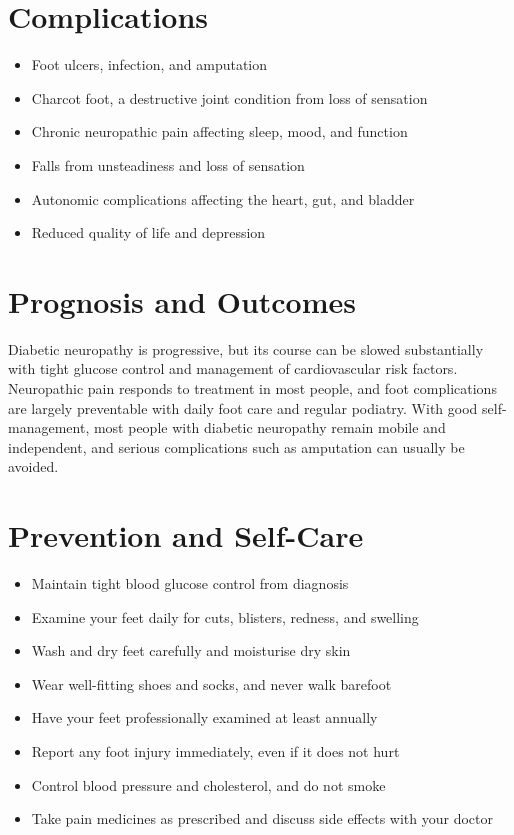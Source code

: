 \section*{Complications}
\begin{itemize}
    \item Foot ulcers, infection, and amputation
    \item Charcot foot, a destructive joint condition from loss of sensation
    \item Chronic neuropathic pain affecting sleep, mood, and function
    \item Falls from unsteadiness and loss of sensation
    \item Autonomic complications affecting the heart, gut, and bladder
    \item Reduced quality of life and depression
\end{itemize}

\section*{Prognosis and Outcomes}
Diabetic neuropathy is progressive, but its course can be slowed substantially with tight glucose control and management of cardiovascular risk factors. Neuropathic pain responds to treatment in most people, and foot complications are largely preventable with daily foot care and regular podiatry. With good self-management, most people with diabetic neuropathy remain mobile and independent, and serious complications such as amputation can usually be avoided.

\section*{Prevention and Self-Care}
\begin{itemize}
    \item Maintain tight blood glucose control from diagnosis
    \item Examine your feet daily for cuts, blisters, redness, and swelling
    \item Wash and dry feet carefully and moisturise dry skin
    \item Wear well-fitting shoes and socks, and never walk barefoot
    \item Have your feet professionally examined at least annually
    \item Report any foot injury immediately, even if it does not hurt
    \item Control blood pressure and cholesterol, and do not smoke
    \item Take pain medicines as prescribed and discuss side effects with your doctor
\end{itemize}

